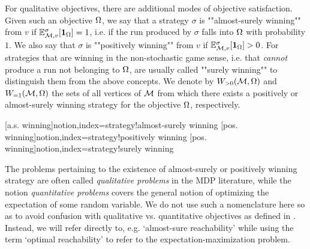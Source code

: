 For qualitative objectives, there are additional modes of objective satisfaction. Given such an objective $\Omega$, we say that a strategy $\sigma$ is ""almost-surely winning"" from $v$ if $\mathbb{E}^{\sigma}_{\mathcal{M},v}[\mathbf{1}_{\Omega}]=1$, i.e. if the run produced by $\sigma$ falls into $\Omega$ with probability $1$. We also say that $\sigma$ is ""positively winning"" from $ v $ if $\mathbb{E}^{\sigma}_{\mathcal{M},v}[\mathbf{1}_{\Omega}]>0$. For strategies that are winning in the non-stochastic game sense, i.e. that \emph{cannot} produce a run not belonging to $\Omega$, are usually called ""surely winning"" to distinguish them from the above concepts. We denote by $W_{>0}(\mathcal{M},\Omega)$ and $W_{=1}(\mathcal{M},\Omega)$ the sets of all vertices of $\mathcal{M}$ from which there exists a positively or almost-surely winning strategy for the objective $\Omega$, respectively.

[a.s. winning]{notion,index={strategy!almost-surely winning}}
[pos. winning]{notion,index={strategy!positively winning}}
[pos. winning]{notion,index={strategy!surely winning}}


The problems pertaining to the existence of almost-surely or positively winning strategy are often called \emph{qualitative problems} in the MDP literature, while the notion \emph{quantitative problems} covers the general notion of optimizing the expectation of some random variable. We do not use such a nomenclature here so as to avoid confusion with qualitative vs. quantitative objectives as defined in . Instead, we will refer directly to, e.g. `almost-sure reachability' while using the term `optimal reachability' to refer to the expectation-maximization problem.

%


%
